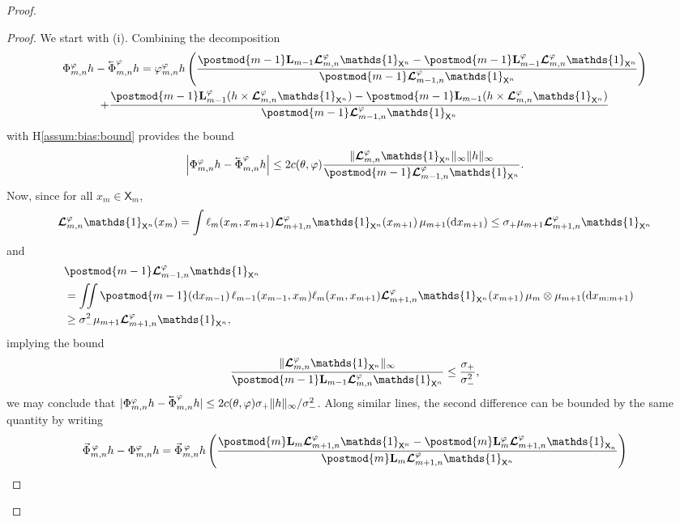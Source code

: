 \documentclass{article}
\newcommand{\uksymbol}{\ell}
\newcommand{\cev}[1]{\reflectbox{\ensuremath{\vec{\reflectbox{\ensuremath{#1}}}}}}
\newcommand{\ukmod}[1]{\mathbf{L}_{#1}^\precpar}
\newcommand{\shiftbwd}{\cev{\shiftsymbol}^{\precpar}}
\newcommand{\shiftfwd}{\vec{\shiftsymbol}^{\, \precpar}}
\newcommand{\shiftsymbol}{\Phi}
\newcommand{\precpar}{\varphi}
\newcommand{\noshift}{\shiftsymbol^{\precpar}}
\newcommand{\udlow}{\sigma_-}
\newcommand{\udup}{\sigma_+}
\newcommand{\ud}[1]{\uksymbol_{#1}}
\newcommand{\1}{\mathbbm{1}}
\newcommand{\retrokmod}{\boldsymbol{\mathcal{L}}^\precpar}
\newcommand{\uk}[1]{\mathbf{L}_{#1}}
\newcommand{\tensprod}{\otimes}
\newcommand{\Xset}{\mathsf{X}}
\def\1{\mathds{1}}
\newcommand{\rmd}{\ensuremath{\mathrm{d}}}
\begin{document}
\begin{proof}
\begin{proof}
We start with (i). Combining the decomposition 
\begin{multline*}
 \noshift_{m, n} h - \shiftbwd_{m, n} h = \varphi_{m, n}^\precpar h \left( \frac{\postmod{m - 1} \uk{m - 1} \retrokmod_{m, n} \1_{\Xset^n} - \postmod{m - 1} \ukmod{m - 1} \retrokmod_{m, n} \1_{\Xset^n}}{\postmod{m - 1} \retrokmod_{m - 1, n} \1_{\Xset^n}} \right) \\
+ \frac{\postmod{m - 1} \ukmod{m - 1}(h \times \retrokmod_{m, n} \1_{\Xset^n}) - \postmod{m - 1} \uk{m - 1}(h \times \retrokmod_{m, n} \1_{\Xset^n})}{\postmod{m - 1} \retrokmod_{m - 1, n} \1_{\Xset^n}} 
\end{multline*}
with H\ref{assum:bias:bound} provides the bound 
$$
\left| \noshift_{m, n} h - \shiftbwd_{m, n} h \right| \leq 2 c(\theta,\varphi) \frac{\| \retrokmod_{m, n} \1_{\Xset^n} \|_\infty  \| h \|_\infty}{\postmod{m - 1} \retrokmod_{m - 1, n} \1_{\Xset^n}}.
$$
 Now, since for all $x_m \in \Xset_m$,  
\begin{equation*}
\retrokmod_{m, n} \1_{\Xset^n}(x_m) = \int \ud{m}(x_m, x_{m + 1}) \retrokmod_{m + 1, n} \1_{\Xset^n}(x_{m + 1}) \, \mu_{m + 1}(\rmd x_{m + 1}) \\
\leq \udup \mu_{m + 1} \retrokmod_{m + 1, n} \1_{\Xset^n} 
\end{equation*}
and 
\begin{align*}
\lefteqn{\postmod{m - 1} \retrokmod_{m - 1, n} \1_{\Xset^n}} \\
&= \iint \postmod{m - 1}(\rmd x_{m - 1}) \, \ud{m - 1}(x_{m - 1}, x_m) \ud{m}(x_m, x_{m + 1}) \retrokmod_{m + 1, n} \1_{\Xset^n}(x_{m + 1}) \, \mu_m \tensprod \mu_{m + 1}(\rmd x_{m:m + 1}) \\ 
&\geq \udlow^2 \mu_{m + 1} \retrokmod_{m + 1, n} \1_{\Xset^n}, 
\end{align*}
implying the bound
\begin{equation} \label{eq:retrokmod:ratio:bd}
 \frac{\| \retrokmod_{m, n} \1_{\Xset^n} \|_\infty}{\postmod{m - 1} \uk{m - 1} \retrokmod_{m, n} \1_{\Xset^n}} \leq \frac{\udup}{\udlow^2}, 
\end{equation}
we may conclude that 
$| \noshift_{m, n} h - \shiftbwd_{m, n} h| \leq 2 c(\theta,\varphi) \udup \| h \|_\infty / \udlow^2
$. 
Along similar lines, the second difference can be bounded by the same quantity by writing   
\begin{multline*}
\shiftfwd_{m, n} h - \noshift_{m, n} h = \shiftfwd_{m, n} h \left( \frac{\postmod{m} \uk{m} \retrokmod_{m + 1, n} \1_{\Xset^n} - \postmod{m} \ukmod{m} \retrokmod_{m + 1, n} \1_{\Xset_n}}{\postmod{m} \uk{m} \retrokmod_{m + 1, n} \1_{\Xset^n}} \right) \\

\end{multline*}
\end{proof}
\end{proof}
\end{document}
